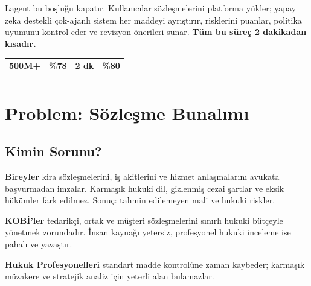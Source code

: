 \documentclass[12pt,a4paper]{article}
\begin{document}
Lagent bu boşluğu kapatır. Kullanıcılar sözleşmelerini platforma yükler; yapay zeka destekli
çok-ajanlı sistem her maddeyi ayrıştırır, risklerini puanlar, politika uyumunu kontrol eder ve
revizyon önerileri sunar. \textbf{Tüm bu süreç 2 dakikadan kısadır.}

\vspace{0.8em}

\begin{statbox}
\begin{center}
\begin{tabular}{p{3.5cm}p{3.5cm}p{3.5cm}p{3.5cm}}
\centering\textbf{\color{primary}\Large 500M+} &
\centering\textbf{\color{primary}\Large \%78} &
\centering\textbf{\color{primary}\Large 2 dk} &
\centering\textbf{\color{primary}\Large \%80} \\[2pt]
\centering{\small Yıllık sözleşme\newline (Türkiye)} &
\centering{\small Anlamadan\newline imzalayanlar} &
\centering{\small Analiz süresi\newline (10 sayfa)} &
\centering{\small Maliyet azalma\newline potansiyeli}
\end{tabular}
\end{center}
\end{statbox}

\section{Problem: Sözleşme Bunalımı}

\subsection{Kimin Sorunu?}

\textbf{Bireyler} kira sözleşmelerini, iş akitlerini ve hizmet anlaşmalarını avukata başvurmadan
imzalar. Karmaşık hukuki dil, gizlenmiş cezai şartlar ve eksik hükümler fark edilmez. Sonuç:
tahmin edilemeyen mali ve hukuki riskler.

\textbf{KOBİ'ler} tedarikçi, ortak ve müşteri sözleşmelerini sınırlı hukuki bütçeyle yönetmek
zorundadır. İnsan kaynağı yetersiz, profesyonel hukuki inceleme ise pahalı ve yavaştır.

\textbf{Hukuk Profesyonelleri} standart madde kontrolüne zaman kaybeder; karmaşık müzakere ve
stratejik analiz için yeterli alan bulamazlar.
\end{document}
